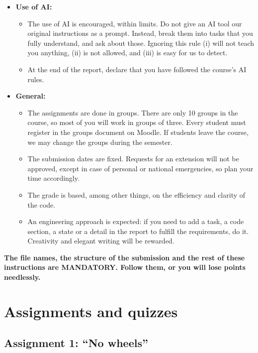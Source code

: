 \documentclass[11pt,a4paper]{article}
\begin{document}
\begin{itemize}
\begin{itemize}[label=$\circ$]
    \item Keep the code tidy: do not include unused code.
  \end{itemize}
  \item \textbf{Use of AI:}
  \begin{itemize}[label=$\circ$]
    \item The use of AI is encouraged, within limits. Do not give an AI tool our original instructions as a prompt.
          Instead, break them into tasks that you fully understand, and ask about those. Ignoring this rule (i) will
          not teach you anything, (ii) is not allowed, and (iii) is easy for us to detect.
    \item At the end of the report, declare that you have followed the course's AI rules.
  \end{itemize}
  \item \textbf{General:}
  \begin{itemize}[label=$\circ$]
    \item The assignments are done in groups. There are only 10 groups in the course, so most of you will work in
          groups of three. Every student must register in the groups document on Moodle. If students leave the
          course, we may change the groups during the semester.
    \item The submission dates are fixed. Requests for an extension will not be approved, except in case of personal
          or national emergencies, so plan your time accordingly.
    \item The grade is based, among other things, on the efficiency and clarity of the code.
    \item An engineering approach is expected: if you need to add a task, a code section, a state or a detail in the
          report to fulfill the requirements, do it. Creativity and elegant writing will be rewarded.
  \end{itemize}
\end{itemize}

\medskip\noindent
{\large\bfseries The file names, the structure of the submission and the rest of these instructions are MANDATORY.
Follow them, or you will lose points needlessly.\par}


\section{Assignments and quizzes}

\subsection{Assignment 1: ``No wheels''}
\end{document}
